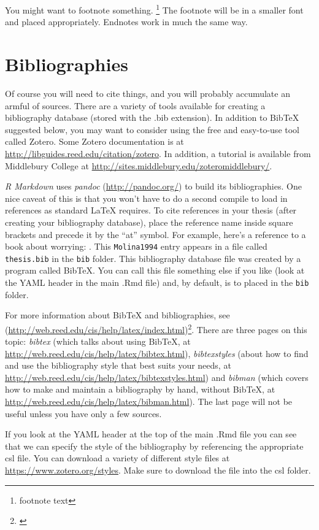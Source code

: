 \documentclass[12pt,letterpaper,oneside,oldfontcommands]{memoir}
\let\rmarkdownfootnote\footnote%
\def\footnote{\protect\rmarkdownfootnote}
\theoremstyle{definition}
\theoremstyle{definition}
\theoremstyle{definition}
\theoremstyle{remark}
\begin{document}
You might want to footnote something. \footnote{footnote text} The
footnote will be in a smaller font and placed appropriately. Endnotes
work in much the same way.

\hypertarget{bibliographies}{%
\section{Bibliographies}\label{bibliographies}}

Of course you will need to cite things, and you will probably accumulate
an armful of sources. There are a variety of tools available for
creating a bibliography database (stored with the .bib extension). In
addition to BibTeX suggested below, you may want to consider using the
free and easy-to-use tool called Zotero. Some Zotero documentation is at
\url{http://libguides.reed.edu/citation/zotero}. In addition, a tutorial
is available from Middlebury College at
\url{http://sites.middlebury.edu/zoteromiddlebury/}.

\emph{R Markdown} uses \emph{pandoc} (\url{http://pandoc.org/}) to build
its bibliographies. One nice caveat of this is that you won't have to do
a second compile to load in references as standard LaTeX requires. To
cite references in your thesis (after creating your bibliography
database), place the reference name inside square brackets and precede
it by the ``at'' symbol. For example, here's a reference to a book about
worrying: \citep{Molina1994}. This \texttt{Molina1994} entry appears in
a file called \texttt{thesis.bib} in the \texttt{bib} folder. This
bibliography database file was created by a program called BibTeX. You
can call this file something else if you like (look at the YAML header
in the main .Rmd file) and, by default, is to placed in the \texttt{bib}
folder.

For more information about BibTeX and bibliographies, see
(\url{http://web.reed.edu/cis/help/latex/index.html})\footnote{\citet{reedweb2007}}.
There are three pages on this topic: \emph{bibtex} (which talks about
using BibTeX, at \url{http://web.reed.edu/cis/help/latex/bibtex.html}),
\emph{bibtexstyles} (about how to find and use the bibliography style
that best suits your needs, at
\url{http://web.reed.edu/cis/help/latex/bibtexstyles.html}) and
\emph{bibman} (which covers how to make and maintain a bibliography by
hand, without BibTeX, at
\url{http://web.reed.edu/cis/help/latex/bibman.html}). The last page
will not be useful unless you have only a few sources.

If you look at the YAML header at the top of the main .Rmd file you can
see that we can specify the style of the bibliography by referencing the
appropriate csl file. You can download a variety of different style
files at \url{https://www.zotero.org/styles}. Make sure to download the
file into the csl folder.
\end{document}
